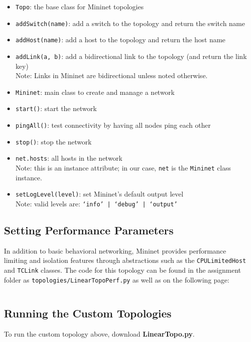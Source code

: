 \documentclass{article}
\begin{document}
\begin{itemize}
    \item \texttt{Topo}: the base class for Mininet topologies
    \item \texttt{addSwitch(name)}: add a switch to the topology and return the switch name
    \item \texttt{addHost(name)}: add a host to the topology and return the host name
    \item \texttt{addLink(a, b)}: add a bidirectional link to the topology (and return the link key)\\
    Note: Links in Mininet are bidirectional unless noted otherwise.
    \item \texttt{Mininet}: main class to create and manage a network
    \item \texttt{start()}: start the network
    \item \texttt{pingAll()}: test connectivity by having all nodes ping each other
    \item \texttt{stop()}: stop the network
    \item \texttt{net.hosts}: all hosts in the network\\
    Note: this is an instance attribute; in our case, \texttt{net} is the \texttt{Mininet} class instance.
    \item \texttt{setLogLevel(level)}: set Mininet's default output level\\
    Note: valid levels are: \texttt{`info' | `debug' | `output'}
\end{itemize}

\subsection{Setting Performance Parameters}
In addition to basic behavioral networking, Mininet provides performance limiting and isolation features through abstractions such as the \texttt{CPULimitedHost} and \texttt{TCLink} classes.
The code for this topology can be found in the assignment folder as \nolinkurl{topologies/LinearTopoPerf.py} as well as on the following page:

\newpage
\inputminted[fontsize=\footnotesize]{python}{topologies/LinearTopoPerf.py}
\newpage

\subsection{Running the Custom Topologies}
To run the custom topology above, download \textbf{LinearTopo.py}.
\end{document}
